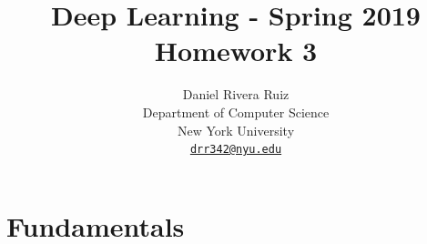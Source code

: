 \documentclass{article}
\title{Deep Learning - Spring 2019\\
       \Large Homework 3}
\author{
  Daniel Rivera Ruiz\\
  Department of Computer Science\\
  New York University\\
  \href{mailto:drr342@nyu.edu}{\texttt{drr342@nyu.edu}}\\
}
\begin{document}
\maketitle



\section{Fundamentals}
\end{document}
